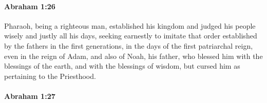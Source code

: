 
		\paragraph{Abraham 1:26} %
			\label{ABRAHAM-1-26}

			Pharaoh, being a righteous man, established his kingdom and judged his people wisely and justly all his days, seeking earnestly to imitate that order established by the fathers in the first generations, in the days of the first patriarchal reign, even in the reign of Adam, and also of Noah, his father, who blessed him with the blessings of the earth, and with the blessings of wisdom, but cursed him as pertaining to the Priesthood.


		\paragraph{Abraham 1:27} %
			\label{ABRAHAM-1-27}

